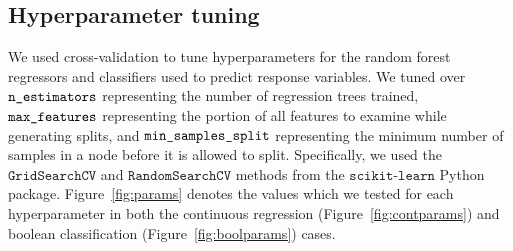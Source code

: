 \documentclass{article} %
\begin{document}




\subsection{Hyperparameter tuning}
\label{sec:hyperparametertuning}

We used cross-validation to tune hyperparameters for the random forest regressors and classifiers used to predict response variables. We tuned over $\texttt{n\textunderscore estimators}$ representing the number of regression trees trained, $\texttt{max\textunderscore features}$ representing the portion of all features to examine while generating splits, and $\texttt{min\textunderscore samples\textunderscore split}$ representing the minimum number of samples in a node before it is allowed to split. Specifically, we used the $\texttt{GridSearchCV}$ and $\texttt{RandomSearchCV}$ methods from the $\texttt{scikit-learn}$ Python package. Figure~\ref{fig:params} denotes the values which we tested for each hyperparameter in both the continuous regression (Figure~\ref{fig:contparams}) and boolean classification (Figure~\ref{fig:boolparams}) cases.
\end{document}
